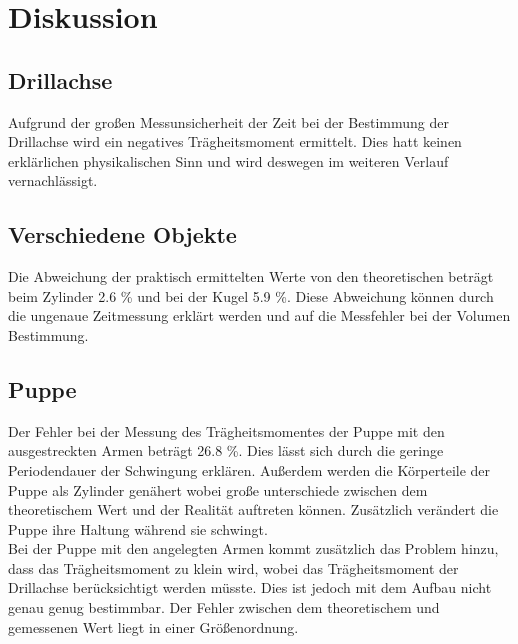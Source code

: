 \section{Diskussion}
\label{sec:Diskussion}
\subsection{Drillachse}
Aufgrund der großen Messunsicherheit der Zeit bei der Bestimmung der Drillachse wird ein negatives Trägheitsmoment ermittelt. Dies hatt keinen erklärlichen physikalischen Sinn und wird deswegen im weiteren Verlauf vernachlässigt.

\subsection{Verschiedene Objekte}
Die Abweichung der praktisch ermittelten Werte von den theoretischen beträgt beim Zylinder  2.6 \% und bei der Kugel 5.9 \%. Diese Abweichung können durch die ungenaue Zeitmessung erklärt werden und auf die Messfehler bei der Volumen Bestimmung.

\subsection{Puppe}
Der Fehler bei der Messung des Trägheitsmomentes der Puppe mit den ausgestreckten Armen beträgt 26.8 \%. Dies lässt sich durch die geringe Periodendauer der Schwingung erklären. Außerdem werden die Körperteile der Puppe als Zylinder genähert wobei große unterschiede zwischen dem theoretischem Wert und der Realität auftreten können. Zusätzlich verändert die Puppe ihre Haltung während sie schwingt.
\ \\
Bei der Puppe mit den angelegten Armen kommt zusätzlich das Problem hinzu, dass das Trägheitsmoment zu klein wird, wobei das Trägheitsmoment der Drillachse berücksichtigt werden müsste. Dies ist jedoch mit dem Aufbau nicht genau genug bestimmbar. Der Fehler zwischen dem theoretischem und gemessenen Wert liegt in einer Größenordnung.
